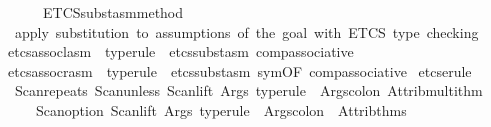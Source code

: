 \begin{isabellebody}
\ \ \ \ \ {\isachargreater}{\kern0pt}{\isachargreater}{\kern0pt}\ ETCS{\isacharunderscore}{\kern0pt}subst{\isacharunderscore}{\kern0pt}asm{\isacharunderscore}{\kern0pt}method{\isacharparenright}{\kern0pt}{\isacartoucheclose}\ \isanewline
\ \ {\isachardoublequoteopen}apply\ substitution\ to\ assumptions\ of\ the\ goal{\isacharcomma}{\kern0pt}\ with\ ETCS\ type\ checking{\isachardoublequoteclose}%
\endisatagML
{\isafoldML}%
%
\isadelimML
\isanewline
%
\endisadelimML
\isanewline
{}\isamarkupfalse%
\ etcs{\isacharunderscore}{\kern0pt}assocl{\isacharunderscore}{\kern0pt}asm\ \ type{\isacharunderscore}{\kern0pt}rule\ {\isacharequal}{\kern0pt}\ {\isacharparenleft}{\kern0pt}etcs{\isacharunderscore}{\kern0pt}subst{\isacharunderscore}{\kern0pt}asm\ comp{\isacharunderscore}{\kern0pt}associative{}{\isacharparenright}{\kern0pt}{\isacharplus}{\kern0pt}\isanewline
{}\isamarkupfalse%
\ etcs{\isacharunderscore}{\kern0pt}assocr{\isacharunderscore}{\kern0pt}asm\ \ type{\isacharunderscore}{\kern0pt}rule\ {\isacharequal}{\kern0pt}\ {\isacharparenleft}{\kern0pt}etcs{\isacharunderscore}{\kern0pt}subst{\isacharunderscore}{\kern0pt}asm\ sym{\isacharbrackleft}{\kern0pt}OF\ comp{\isacharunderscore}{\kern0pt}associative{}{\isacharbrackright}{\kern0pt}{\isacharparenright}{\kern0pt}{\isacharplus}{\kern0pt}%
\isadelimdocument
%
\endisadelimdocument
%
\isatagdocument
%
\isamarkuptrue%
%
\endisatagdocument
{\isafolddocument}%
%
\isadelimdocument
%
\endisadelimdocument
%
\isadelimML
%
\endisadelimML
%
\isatagML
{}\isamarkupfalse%
\ etcs{\isacharunderscore}{\kern0pt}erule\ {\isacharequal}{\kern0pt}\ \isanewline
\ \ {\isacartoucheopen}Scan{\isachardot}{\kern0pt}repeats\ {\isacharparenleft}{\kern0pt}Scan{\isachardot}{\kern0pt}unless\ {\isacharparenleft}{\kern0pt}Scan{\isachardot}{\kern0pt}lift\ {\isacharparenleft}{\kern0pt}Args{\isachardot}{\kern0pt}{\isachardollar}{\kern0pt}{\isachardollar}{\kern0pt}{\isachardollar}{\kern0pt}\ {\isachardoublequote}{\kern0pt}type{\isacharunderscore}{\kern0pt}rule{\isachardoublequote}{\kern0pt}\ {\isacharminus}{\kern0pt}{\isacharminus}{\kern0pt}\ Args{\isachardot}{\kern0pt}colon{\isacharparenright}{\kern0pt}{\isacharparenright}{\kern0pt}\ Attrib{\isachardot}{\kern0pt}multi{\isacharunderscore}{\kern0pt}thm{\isacharparenright}{\kern0pt}\isanewline
\ \ \ \ {\isacharminus}{\kern0pt}{\isacharminus}{\kern0pt}\ Scan{\isachardot}{\kern0pt}option\ {\isacharparenleft}{\kern0pt}{\isacharparenleft}{\kern0pt}Scan{\isachardot}{\kern0pt}lift\ {\isacharparenleft}{\kern0pt}Args{\isachardot}{\kern0pt}{\isachardollar}{\kern0pt}{\isachardollar}{\kern0pt}{\isachardollar}{\kern0pt}\ {\isachardoublequote}{\kern0pt}type{\isacharunderscore}{\kern0pt}rule{\isachardoublequote}{\kern0pt}\ {\isacharminus}{\kern0pt}{\isacharminus}{\kern0pt}\ Args{\isachardot}{\kern0pt}colon{\isacharparenright}{\kern0pt}{\isacharparenright}{\kern0pt}\ {\isacharbar}{\kern0pt}{\isacharminus}{\kern0pt}{\isacharminus}{\kern0pt}\ Attrib{\isachardot}{\kern0pt}thms{\isacharparenright}{\kern0pt}\isanewline

\end{isabellebody}
